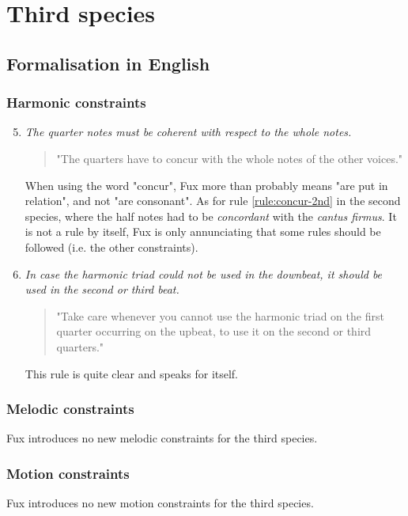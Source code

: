 \section{Third species}
\subsection{Formalisation in English}\label{formalisation-en-3rd}
\subsubsection{Harmonic constraints}
\begin{enumerate}[wide, label=\bfseries 3.H\arabic*]
\setcounter{enumi}{4}
    \item \textit{The quarter notes must be coherent with respect to the whole notes.} \label{rule:concur-3rd}    
    \begin{quotation}
        "The quarters have to concur with the whole notes of the other voices."
        \textcite[p.91]{GaPEng}
    \end{quotation}
    When using the word "concur", Fux more than probably means "are put in relation", and not "are consonant". As for rule \ref{rule:concur-2nd} in the second species, where the half notes had to be \textit{concordant} with the \textit{cantus firmus}. It is not a rule by itself, Fux is only annunciating that some rules should be followed (i.e. the other constraints).

    \item \textit{In case the harmonic triad could not be used in the downbeat, it should be used in the second or third beat.} \label{rule:coherent}    
    \begin{quotation}
        "Take care whenever you cannot use the harmonic triad on the first quarter occurring on the upbeat, to use it on the second or third quarters."
        \textcite[p.91]{GaPEng}
    \end{quotation}

    This rule is quite clear and speaks for itself.
\end{enumerate}

\subsubsection{Melodic constraints}
Fux introduces no new melodic constraints for the third species.
\subsubsection{Motion constraints}
Fux introduces no new motion constraints for the third species.


